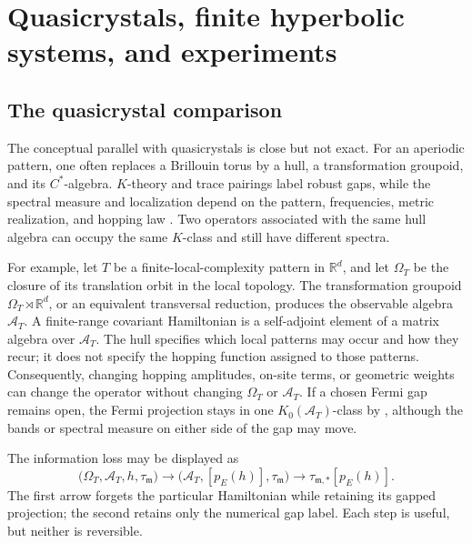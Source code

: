 \documentclass[11pt]{article}
\theoremstyle{definition}
\theoremstyle{remark}
\newcommand{\RR}{\mathbb R}
\begin{document}
\section{Quasicrystals, finite hyperbolic systems, and experiments}
\label{sec:quasicrystals-experiments}

\subsection{The quasicrystal comparison}

The conceptual parallel with quasicrystals is close but not exact.  For an
aperiodic pattern, one often replaces a Brillouin torus by a hull, a
transformation groupoid, and its \(C^*\)-algebra.  \(K\)-theory and trace
pairings label robust gaps, while the spectral measure and localization
depend on the pattern, frequencies, metric realization, and hopping law
\cite{BaakeGrimm,KellendonkPutnam}.  Two operators associated with the same
hull algebra can occupy the same \(K\)-class and still have different
spectra.

For example, let \(T\) be a finite-local-complexity pattern in \(\RR^d\), and
let \(\Omega_T\) be the closure of its translation orbit in the local
topology.  The transformation groupoid
\(\Omega_T\rtimes\RR^d\), or an equivalent transversal reduction, produces
the observable algebra \(\mathcal A_T\).  A finite-range covariant
Hamiltonian is a self-adjoint element of a matrix algebra over
\(\mathcal A_T\).  The hull specifies which local patterns may occur and how
they recur; it does not specify the hopping function assigned to those
patterns.  Consequently, changing hopping amplitudes, on-site terms, or
geometric weights can change the operator without changing \(\Omega_T\) or
\(\mathcal A_T\).  If a chosen Fermi gap remains open, the Fermi projection
stays in one \(K_0(\mathcal A_T)\)-class by
, although the bands or spectral measure on either
side of the gap may move.

The information loss may be displayed as
\[
 \bigl(\Omega_T,\mathcal A_T,h,\tau_{\mathfrak m}\bigr)
   \longrightarrow
 \bigl(\mathcal A_T,[p_E(h)],\tau_{\mathfrak m}\bigr)
   \longrightarrow
 \tau_{\mathfrak m,*}[p_E(h)].
 \tag{10.1}\label{eq:quasicrystal-forgetting}
\]
The first arrow forgets the particular Hamiltonian while retaining its
gapped projection; the second retains only the numerical gap label.  Each
step is useful, but neither is reversible.
\end{document}
